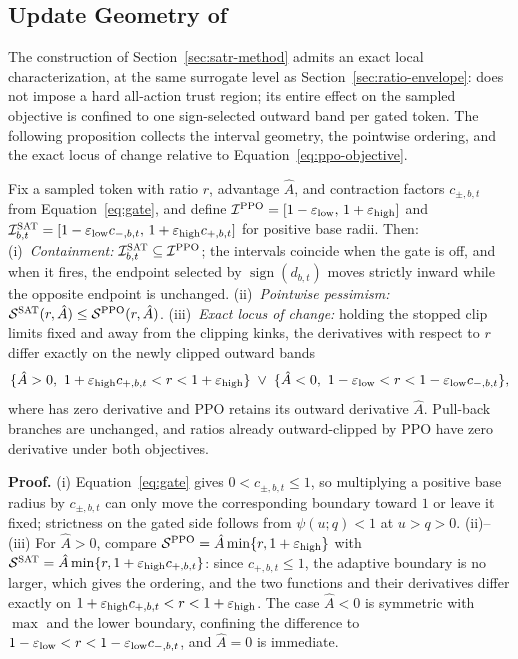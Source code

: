 \subsection{Update Geometry of \satr}
\label{sec:satr-mechanism}
 
The construction of Section~\ref{sec:satr-method} admits an exact local characterization, at the same surrogate level as Section~\ref{sec:ratio-envelope}: \satr{} does not impose a hard all-action trust region; its entire effect on the sampled objective is confined to one sign-selected outward band per gated token. The following proposition collects the interval geometry, the pointwise ordering, and the exact locus of change relative to Equation~\eqref{eq:ppo-objective}.
 
\begin{proposition}
\label{prop:geometry}
\label{prop:containment}
\label{prop:pessimism}
Fix a sampled token with ratio $r$, advantage $\hat A$, and contraction factors $c_{\pm,b,t}$ from Equation~\eqref{eq:gate}, and define
$\mathcal{I}^{\mathrm{PPO}}=[1-\varepsilon_{\mathrm{low}},\,1+\varepsilon_{\mathrm{high}}]$ and
$\mathcal{I}^{\textsc{SAT}}_{b,t}=[1-\varepsilon_{\mathrm{low}} c_{-,b,t},\,1+\varepsilon_{\mathrm{high}} c_{+,b,t}]$
for positive base radii. Then:
(i)~\emph{Containment:} $\mathcal{I}^{\textsc{SAT}}_{b,t}\subseteq\mathcal{I}^{\mathrm{PPO}}$; the intervals coincide when the gate is off, and when it fires, the endpoint selected by $\operatorname{sign}(d_{b,t})$ moves strictly inward while the opposite endpoint is unchanged.
(ii)~\emph{Pointwise pessimism:} $\mathcal S^{\textsc{SAT}}(r,\hat A)\le\mathcal S^{\mathrm{PPO}}(r,\hat A)$.
(iii)~\emph{Exact locus of change:} holding the stopped clip limits fixed and away from the clipping kinks, the derivatives with respect to $r$ differ exactly on the newly clipped outward bands
\begin{equation}
\{\hat A>0,\ 1+\varepsilon_{\mathrm{high}} c_{+,b,t}<r<1+\varepsilon_{\mathrm{high}}\}
\;\vee\;
\{\hat A<0,\ 1-\varepsilon_{\mathrm{low}}<r<1-\varepsilon_{\mathrm{low}} c_{-,b,t}\},
\label{eq:bands}
\end{equation}
where \satr{} has zero derivative and PPO retains its outward derivative $\hat A$. Pull-back branches are unchanged, and ratios already outward-clipped by PPO have zero derivative under both objectives.
\end{proposition}
 
\textbf{Proof.}
(i) Equation~\eqref{eq:gate} gives $0<c_{\pm,b,t}\le 1$, so multiplying a positive base radius by $c_{\pm,b,t}$ can only move the corresponding boundary toward $1$ or leave it fixed; strictness on the gated side follows from $\psi(u;q)<1$ at $u>q>0$.
(ii)--(iii) For $\hat A>0$, compare $\mathcal S^{\mathrm{PPO}}=\hat A\min\{r,1+\varepsilon_{\mathrm{high}}\}$ with $\mathcal S^{\textsc{SAT}}=\hat A\min\{r,1+\varepsilon_{\mathrm{high}} c_{+,b,t}\}$: since $c_{+,b,t}\le 1$, the adaptive boundary is no larger, which gives the ordering, and the two functions and their derivatives differ exactly on $1+\varepsilon_{\mathrm{high}} c_{+,b,t}<r<1+\varepsilon_{\mathrm{high}}$. The case $\hat A<0$ is symmetric with $\max$ and the lower boundary, confining the difference to $1-\varepsilon_{\mathrm{low}}<r<1-\varepsilon_{\mathrm{low}} c_{-,b,t}$, and $\hat A=0$ is immediate.

